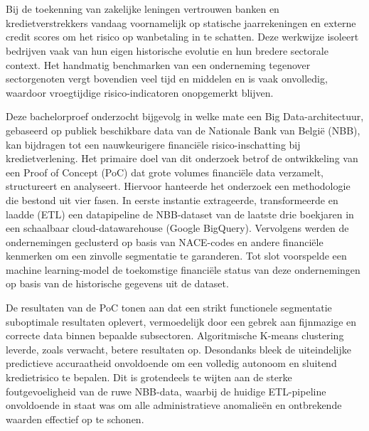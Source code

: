 
\chapter*{}

Bij de toekenning van zakelijke leningen vertrouwen banken en kredietverstrekkers vandaag voornamelijk op statische jaarrekeningen en externe credit scores om het risico op wanbetaling in te schatten. Deze werkwijze isoleert bedrijven vaak van hun eigen historische evolutie en hun bredere sectorale context. Het handmatig benchmarken van een onderneming tegenover sectorgenoten vergt bovendien veel tijd en middelen en is vaak onvolledig, waardoor vroegtijdige risico-indicatoren onopgemerkt blijven.

Deze bachelorproef onderzocht bijgevolg in welke mate een Big Data-architectuur, gebaseerd op publiek beschikbare data van de Nationale Bank van België (NBB), kan bijdragen tot een nauwkeurigere financiële risico-inschatting bij kredietverlening. Het primaire doel van dit onderzoek betrof de ontwikkeling van een Proof of Concept (PoC) dat grote volumes financiële data verzamelt, structureert en analyseert. Hiervoor hanteerde het onderzoek een methodologie die bestond uit vier fasen. In eerste instantie extrageerde, transformeerde en laadde (ETL) een datapipeline de NBB-dataset van de laatste drie boekjaren in een schaalbaar cloud-datawarehouse (Google BigQuery). Vervolgens werden de ondernemingen geclusterd op basis van NACE-codes en andere financiële kenmerken om een zinvolle segmentatie te garanderen. Tot slot voorspelde een machine learning-model de toekomstige financiële status van deze ondernemingen op basis van de historische gegevens uit de dataset.

De resultaten van de PoC tonen aan dat een strikt functionele segmentatie suboptimale resultaten oplevert, vermoedelijk door een gebrek aan fijnmazige en correcte data binnen bepaalde subsectoren. Algoritmische K-means clustering leverde, zoals verwacht, betere resultaten op. Desondanks bleek de uiteindelijke predictieve accuraatheid onvoldoende om een volledig autonoom en sluitend kredietrisico te bepalen. Dit is grotendeels te wijten aan de sterke foutgevoeligheid van de ruwe NBB-data, waarbij de huidige ETL-pipeline onvoldoende in staat was om alle administratieve anomalieën en ontbrekende waarden effectief op te schonen.
